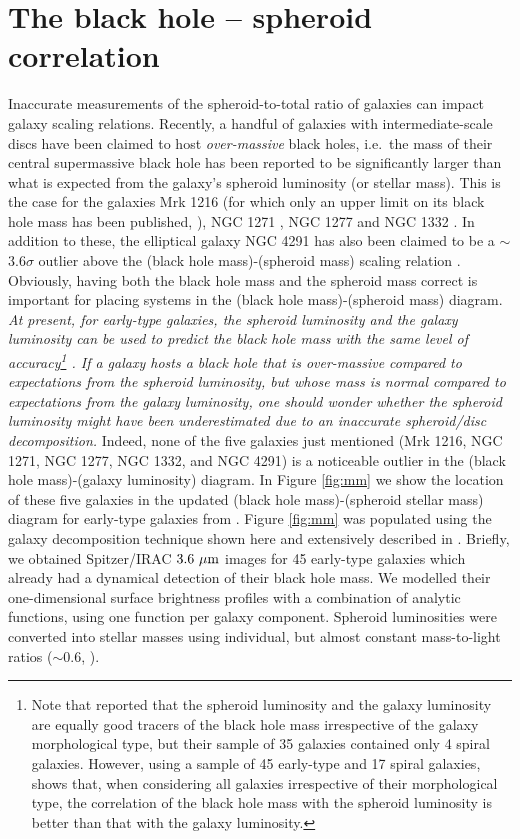 \documentclass[useAMS,usenatbib,article]{mnras}
\begin{document}
\section{The black hole -- spheroid correlation}
\label{sec:mm}
Inaccurate measurements of the spheroid-to-total ratio of galaxies can impact galaxy scaling relations. 
Recently, a handful of galaxies with intermediate-scale discs have been claimed to host \emph{over-massive} black holes, 
i.e.~the mass of their central supermassive black hole has been reported to be significantly larger 
than what is expected from the galaxy's spheroid luminosity (or stellar mass).
This is the case for the galaxies Mrk 1216 (for which only an upper limit on its black hole mass has been published, 
\citealt{yildirim2015}), NGC 1271 \citep{walsh2015}, 
NGC 1277 \citep{vandenbosch2012,yildirim2015} and NGC 1332 \citep{rusli2011}.
In addition to these, the elliptical galaxy NGC 4291 has also been claimed to be a $\sim$$3.6\sigma$ outlier 
above the (black hole mass)-(spheroid mass) scaling relation \citep{bogdan2012}. 
Obviously, having both the black hole mass and the spheroid mass correct is important 
for placing systems in the (black hole mass)-(spheroid mass) diagram. \\
\emph{At present, for early-type galaxies, the spheroid luminosity and the galaxy luminosity 
can be used to predict the black hole mass with the same level of accuracy\footnote{Note that 
\cite{lasker2014anal} reported that the spheroid luminosity and the galaxy luminosity are equally good tracers of the black hole mass 
irrespective of the galaxy morphological type, but their sample of 35 galaxies contained only 4 spiral galaxies. 
However, using a sample of 45 early-type and 17 spiral galaxies, 
\cite{paperII} shows that, when considering all galaxies irrespective of their morphological type, 
the correlation of the black hole mass with the spheroid luminosity is better than that with the galaxy luminosity.} 
\citep{paperII}. 
If a galaxy hosts a black hole that is over-massive compared to expectations from the spheroid luminosity, 
but whose mass is normal compared to expectations from the galaxy luminosity, 
one should wonder whether the spheroid luminosity might have been underestimated 
due to an inaccurate spheroid/disc decomposition. }
Indeed, none of the five galaxies just mentioned (Mrk 1216, NGC 1271, NGC 1277, NGC 1332, and NGC 4291) is a noticeable outlier 
in the (black hole mass)-(galaxy luminosity) diagram. 
In Figure \ref{fig:mm} we show the location of these five galaxies in the updated (black hole mass)-(spheroid stellar mass) diagram 
for early-type galaxies from \cite{paperII}. 
Figure \ref{fig:mm} was populated using the galaxy decomposition technique shown here 
and extensively described in \cite{paperI}. 
Briefly, we obtained Spitzer/IRAC $3.6~\rm \mu m$ images for 45 early-type galaxies 
which already had a dynamical detection of their black hole mass. 
We modelled their one-dimensional surface brightness profiles with a combination of analytic functions, 
using one function per galaxy component. 
Spheroid luminosities were converted into stellar masses using individual, 
but almost constant mass-to-light ratios ($\sim$$0.6$, \citealt{meidt2014}). \\
\end{document}
